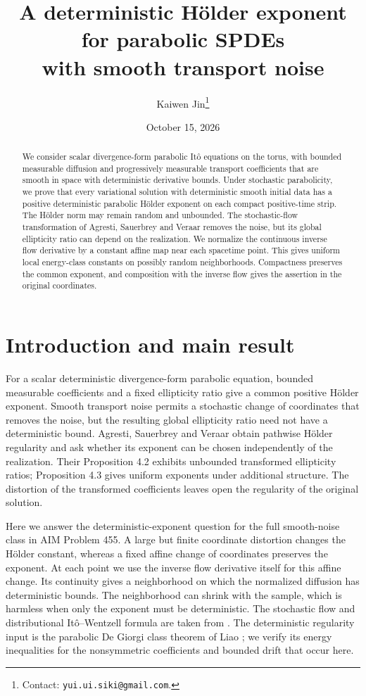 \documentclass[11pt]{article}
\title{A deterministic H\"older exponent for parabolic SPDEs\protect\\with smooth transport noise}
\author{Kaiwen Jin\thanks{Contact: \texttt{yui.ui.siki@gmail.com}.}}
\date{October 15, 2026}
\begin{document}
\maketitle
\begin{abstract}
We consider scalar divergence-form parabolic It\^o equations on the torus,
with bounded measurable diffusion and progressively measurable transport
coefficients that are smooth in space with deterministic derivative bounds.
Under stochastic parabolicity, we prove that every variational solution with
deterministic smooth initial data has a positive deterministic parabolic
H\"older exponent on each compact positive-time strip. The H\"older norm may
remain random and unbounded. The stochastic-flow transformation of Agresti,
Sauerbrey and Veraar removes the noise, but its global ellipticity ratio can
depend on the realization. We normalize the continuous inverse flow derivative
by a constant affine map near each spacetime point. This gives uniform local
energy-class constants on possibly random neighborhoods. Compactness preserves
the common exponent, and composition with the inverse flow gives the assertion
in the original coordinates.
\end{abstract}

\section{Introduction and main result}

For a scalar deterministic divergence-form parabolic equation, bounded
measurable coefficients and a fixed ellipticity ratio give a common positive
H\"older exponent. Smooth transport noise permits a stochastic change of
coordinates that removes the noise, but the resulting global ellipticity ratio
need not have a deterministic bound. Agresti, Sauerbrey and Veraar
\cite[Theorem 1.1 and Section 1.2]{ASV} obtain pathwise H\"older regularity and
ask whether its exponent can be chosen independently of the realization.
Their Proposition 4.2 exhibits unbounded transformed ellipticity ratios;
Proposition 4.3 gives uniform exponents under additional structure. The
distortion of the transformed coefficients leaves open the regularity of the
original solution.

Here we answer the deterministic-exponent question for the full smooth-noise
class in AIM Problem 455. A large but finite coordinate distortion changes
the H\"older constant, whereas a fixed affine change of coordinates preserves
the exponent. At each point we use the inverse flow derivative itself for this
affine change. Its continuity gives a neighborhood on which the normalized
diffusion has deterministic bounds. The neighborhood can shrink with the
sample, which is harmless when only the exponent must be deterministic.
The stochastic flow and distributional It\^o--Wentzell formula are taken from
\cite{ASV}. The deterministic regularity input is the parabolic De Giorgi
class theorem of Liao \cite{Liao}; we verify its energy inequalities for the
nonsymmetric coefficients and bounded drift that occur here.
\end{document}
